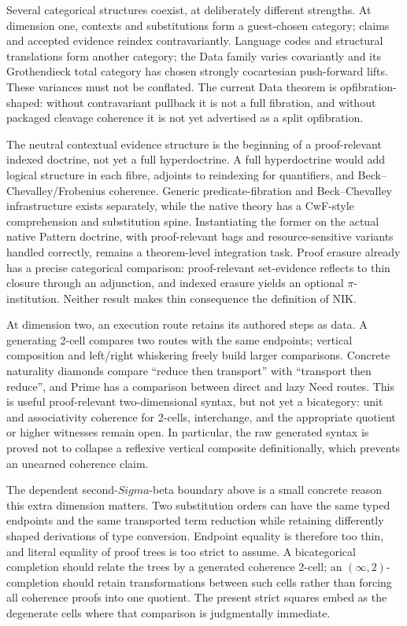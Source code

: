 \documentclass[11pt]{article}
\begin{document}
Several categorical structures coexist, at deliberately different strengths.
At dimension one, contexts and substitutions form a guest-chosen category;
claims and accepted evidence reindex contravariantly.  Language codes and
structural translations form another category; the Data family varies
covariantly and its Grothendieck total category has chosen strongly cocartesian
push-forward lifts.  These variances must not be conflated.  The current Data
theorem is opfibration-shaped: without contravariant pullback it is not a full
fibration, and without packaged cleavage coherence it is not yet advertised as
a split opfibration.

The neutral contextual evidence structure is the beginning of a proof-relevant
indexed doctrine, not yet a full hyperdoctrine.  A full hyperdoctrine would add
logical structure in each fibre, adjoints to reindexing for quantifiers, and
Beck--Chevalley/Frobenius coherence.  Generic predicate-fibration and
Beck--Chevalley infrastructure exists separately, while the native theory has a
CwF-style comprehension and substitution spine.  Instantiating the former on the
actual native Pattern doctrine, with proof-relevant bags and resource-sensitive
variants handled correctly, remains a theorem-level integration task.  Proof
erasure already has a precise categorical comparison: proof-relevant set-evidence
reflects to thin closure through an adjunction, and indexed erasure yields an
optional $\pi$-institution.  Neither result makes thin consequence the definition
of NIK.

At dimension two, an execution route retains its authored steps as data.  A
generating 2-cell compares two routes with the same endpoints; vertical
composition and left/right whiskering freely build larger comparisons.  Concrete
naturality diamonds compare ``reduce then transport'' with ``transport then
reduce'', and Prime has a comparison between direct and lazy Need routes.  This is
useful proof-relevant two-dimensional syntax, but not yet a bicategory: unit and
associativity coherence for 2-cells, interchange, and the appropriate quotient or
higher witnesses remain open.  In particular, the raw generated syntax is proved
not to collapse a reflexive vertical composite definitionally, which prevents an
unearned coherence claim.

The dependent second-$Sigma$-beta boundary above is a small concrete reason this
extra dimension matters.  Two substitution orders can have the same typed
endpoints and the same transported term reduction while retaining differently
shaped derivations of type conversion.  Endpoint equality is therefore too thin,
and literal equality of proof trees is too strict to assume.  A bicategorical
completion should relate the trees by a generated coherence 2-cell; an
$(\infty,2)$-completion should retain transformations between such cells rather
than forcing all coherence proofs into one quotient.  The present strict squares
embed as the degenerate cells where that comparison is judgmentally immediate.
\end{document}
